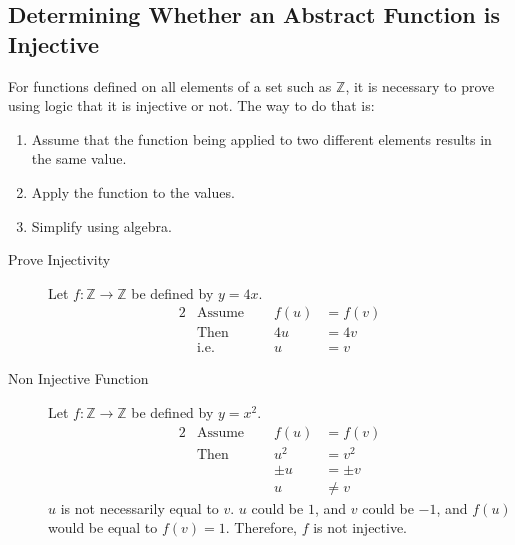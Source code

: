 \documentclass[../notes.tex]{subfiles}
\begin{document}
			\subsection{Determining Whether an Abstract Function is Injective}
				For functions defined on all elements of a set such as $\mathbb{Z}$, it is necessary to prove using logic that it is injective or not. The way to do that is:
				\begin{enumerate}
					\item Assume that the function being applied to two different elements results in the same value.
					\item Apply the function to the values.
					\item Simplify using algebra.
				\end{enumerate}
				\begin{example}
					\begin{description}
						\item[Prove Injectivity] Let $f: \mathbb{Z} \rightarrow \mathbb{Z}$ be defined by $y = 4x$.
							\begin{alignat*}{2}
								& \text{Assume } \quad &f(u) &= f(v)\tag*{$(1)$}\\
								& \text{Then } &4u &= 4v\tag*{$(2)$}\\
								& \text{i.e. } &u &= v\tag*{$(3)$}
							\end{alignat*}
						\item[Non Injective Function]  Let $f: \mathbb{Z} \rightarrow \mathbb{Z}$ be defined by $y = x^{2}$.
							\begin{alignat*}{2}
								& \text{Assume } \quad &f(u) &= f(v)\\
								& \text{Then } &u^{2} &= v^{2}\\
								& & \pm{u} &= \pm{v}\\
								& & u &\neq v
							\end{alignat*}
							$u$ is not necessarily equal to $v$. $u$ could be $1$, and $v$ could be $-1$, and $f(u)$ would be equal to $f(v) = 1$. Therefore, $f$ is not injective.
					\end{description}
				\end{example}
\end{document}
